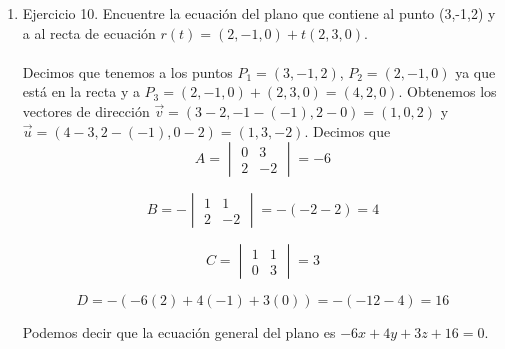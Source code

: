 \documentclass[10pt,letterpaper,fleqn]{article}
\begin{document}
\begin{enumerate}
        \item Ejercicio 10. Encuentre la ecuación del plano que contiene al punto (3,-1,2) y a al recta de ecuación $r(t)=(2,-1,0)+t(2,3,0)$. \\
        \\Decimos que tenemos a los puntos $P_1=(3,-1,2)$, $P_2=(2,-1,0)$ ya que está en la recta y a $P_3=(2,-1,0)+(2,3,0)=(4,2,0)$. Obtenemos 
        los vectores de dirección $\overrightarrow{v}=(3-2,-1-(-1),2-0)=(1,0,2)$ y $\overrightarrow{u}=(4-3,2-(-1),0-2)=(1,3,-2)$.
        Decimos que 
        $$ A =
        \begin{vmatrix}
          0 & 3 \\
          2 & -2
        \end{vmatrix}
        = -6
        $$

        $$ B = -
        \begin{vmatrix}
          1 & 1 \\
          2 & -2
        \end{vmatrix}
        = -(-2 -2) = 4
        $$

        $$ C =
        \begin{vmatrix}
          1 & 1 \\
          0 & 3
        \end{vmatrix}
        = 3
        $$        

        $$ D = -(-6(2) + 4(-1) + 3(0))= -(-12-4) = 16$$       

        Podemos decir que la ecuación general del plano es $-6x + 4y + 3z + 16 = 0$.


\end{enumerate}
\end{document}

